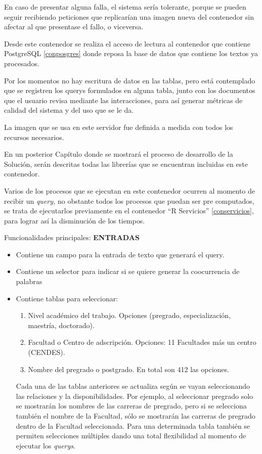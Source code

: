 \documentclass[
  10,
  openany]{book}
\providecommand{\tightlist}{%
  \setlength{\itemsep}{0pt}\setlength{\parskip}{0pt}}
\begin{document}
En caso de presentar alguna falla, el sistema sería tolerante, porque se pueden seguir recibiendo peticiones que replicarían una imagen nueva del contenedor sin afectar al que presentase el fallo, o viceversa.

Desde este contenedor se realiza el acceso de lectura al contenedor que contiene PostgreSQL \ref{conposgres} donde reposa la base de datos que contiene los textos ya procesados.

Por los momentos no hay escritura de datos en las tablas, pero está contemplado que se registren los querys formulados en alguna tabla, junto con los documentos que el usuario revisa mediante las interacciones, para así generar métricas de calidad del sistema y del uso que se le da.

La imagen que se usa en este servidor fue definida a medida con todos los recursos necesarios.

En un posterior Capítulo donde se mostrará el proceso de desarrollo de la Solución, serán descritas todas las librerías que se encuentran incluidas en este contenedor.

Varios de los procesos que se ejecutan en este contenedor ocurren al momento de recibir un \emph{query,} no obstante todos los procesos que puedan ser pre computados, se trata de ejecutarlos previamente en el contenedor ``R Servicios'' \ref{conservicios}, para lograr así la disminución de los tiempos.

Funcionalidades principales: \textbf{ENTRADAS}

\begin{itemize}
\item
  Contiene un campo para la entrada de texto que generará el query.
\item
  Contiene un selector para indicar si se quiere generar la coocurrencia de palabras
\item
  Contiene tablas para seleccionar:

  \begin{enumerate}
  \def\labelenumi{\arabic{enumi})}
  \tightlist
  \item
    Nivel académico del trabajo. Opciones (pregrado, especialización, maestría, doctorado).
  \item
    Facultad o Centro de adscripción. Opciones: 11 Facultades más un centro (CENDES).
  \item
    Nombre del pregrado o postgrado. En total son 412 las opciones.
  \end{enumerate}

  Cada una de las tablas anteriores se actualiza según se vayan seleccionando las relaciones y la disponibilidades. Por ejemplo, al seleccionar pregrado solo se mostrarán los nombres de las carreras de pregrado, pero si se selecciona también el nombre de la Facultad, sólo se mostrarán las carreras de pregrado dentro de la Facultad seleccionada. Para una determinada tabla también se permiten selecciones múltiples dando una total flexibilidad al momento de ejecutar los \emph{querys}.
\end{itemize}
\end{document}
